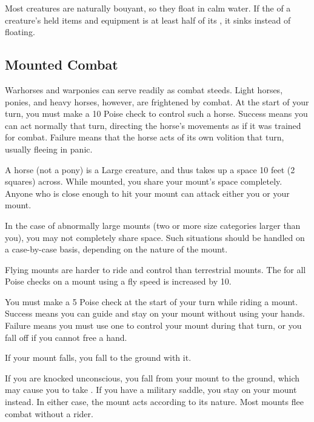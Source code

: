     Most creatures are naturally bouyant, so they float in calm water.
    If the  of a creature's held items and equipment is at least half of its , it sinks instead of floating.

  \subsection{Mounted Combat}\label{Mounted Combat}
     Warhorses and warponies can serve readily as combat steeds. Light horses, ponies, and heavy horses, however, are frightened by combat.
    At the start of your turn, you must make a  10 Poise check to control such a horse.
    Success means you can act normally that turn, directing the horse's movements as if it was trained for combat.
    Failure means that the horse acts of its own volition that turn, usually fleeing in panic.

     A horse (not a pony) is a Large creature, and thus takes up a space 10 feet (2 squares) across. While mounted, you share your mount's space completely. Anyone who is close enough to hit your mount can attack either you or your mount.

    In the case of abnormally large mounts (two or more size categories larger than you), you may not completely share space. Such situations should be handled on a case-by-case basis, depending on the nature of the mount.

     Flying mounts are harder to ride and control than terrestrial mounts.
    The  for all Poise checks on a mount using a fly speed is increased by 10.

     You must make a  5 Poise check at the start of your turn while riding a mount.
    Success means you can guide and stay on your mount without using your hands.
    Failure means you must use one  to control your mount during that turn, or you fall off if you cannot free a hand.

     If your mount falls, you fall to the ground with it.

     If you are knocked unconscious, you fall from your mount to the ground, which may cause you to take .
    If you have a military saddle, you stay on your mount instead.
    In either case, the mount acts according to its nature.
    Most mounts flee combat without a rider.

